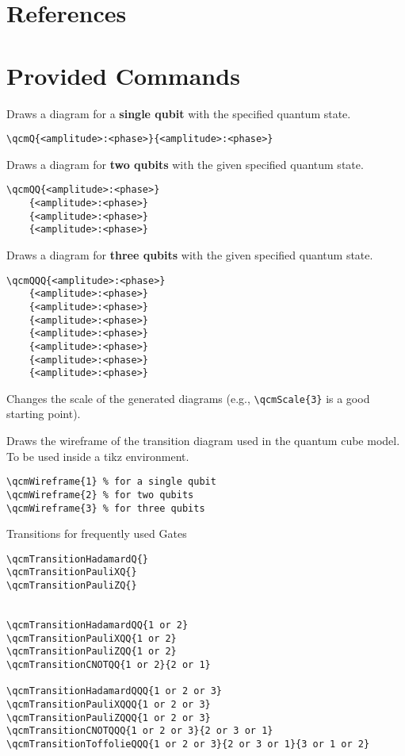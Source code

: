 \documentclass{article}
\begin{document}
\section*{References}


\section*{Provided Commands}

\begin{description}
    \item Draws a diagram for a \textbf{single qubit} with the specified quantum state.
    \begin{verbatim}
\qcmQ{<amplitude>:<phase>}{<amplitude>:<phase>}
    \end{verbatim}

    \item Draws a diagram for \textbf{two qubits} with the given specified quantum state.
    \begin{verbatim}
\qcmQQ{<amplitude>:<phase>}
    {<amplitude>:<phase>}
    {<amplitude>:<phase>}
    {<amplitude>:<phase>}
    \end{verbatim}

    \item  Draws a diagram for \textbf{three qubits} with the given specified quantum state.
    \begin{verbatim}
\qcmQQQ{<amplitude>:<phase>}
    {<amplitude>:<phase>}
    {<amplitude>:<phase>}
    {<amplitude>:<phase>}
    {<amplitude>:<phase>}
    {<amplitude>:<phase>}
    {<amplitude>:<phase>}
    {<amplitude>:<phase>}
    \end{verbatim}

  
    \item Changes the scale of the generated diagrams (e.g., \verb|\qcmScale{3}| is a good starting point).
  
    \item Draws the wireframe of the transition diagram used in the quantum cube model.
        To be used inside a tikz environment.
    \begin{verbatim}
\qcmWireframe{1} % for a single qubit
\qcmWireframe{2} % for two qubits
\qcmWireframe{3} % for three qubits
    \end{verbatim}

    \item Transitions for frequently used Gates
    \begin{verbatim}
\qcmTransitionHadamardQ{}
\qcmTransitionPauliXQ{}
\qcmTransitionPauliZQ{}


\qcmTransitionHadamardQQ{1 or 2}
\qcmTransitionPauliXQQ{1 or 2}
\qcmTransitionPauliZQQ{1 or 2}
\qcmTransitionCNOTQQ{1 or 2}{2 or 1}

\qcmTransitionHadamardQQQ{1 or 2 or 3}
\qcmTransitionPauliXQQQ{1 or 2 or 3}
\qcmTransitionPauliZQQQ{1 or 2 or 3}
\qcmTransitionCNOTQQQ{1 or 2 or 3}{2 or 3 or 1}
\qcmTransitionToffolieQQQ{1 or 2 or 3}{2 or 3 or 1}{3 or 1 or 2}
    \end{verbatim}
\end{description}
\end{document}

